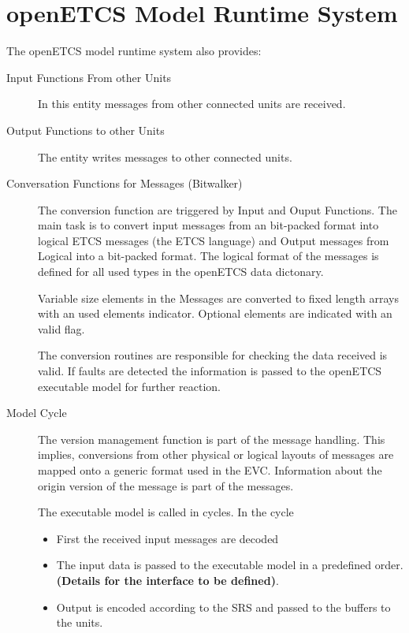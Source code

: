 \section{openETCS Model Runtime System}
The openETCS model runtime system also provides:
\begin{description}

\item[Input Functions From other Units]
In this entity messages from other connected units are received.

\item[Output Functions to other Units]
The entity writes messages to other connected units.

\item[Conversation Functions for Messages (Bitwalker)]
The conversion function are triggered by Input and Ouput Functions. The main task is to convert input messages from an bit-packed format into logical ETCS messages (the ETCS language) and Output messages from Logical into a bit-packed format. The logical format of the messages is defined for all used types in the openETCS data dictonary.

Variable size elements in the Messages are converted to fixed length arrays with an used elements indicator. Optional elements are indicated with an valid flag.

The conversion routines are responsible for checking the data received is valid. If  faults are detected the information is passed to the openETCS executable model for further reaction. 

\item[Model Cycle]
The version management function is part of the message handling. This implies, conversions from other physical or logical layouts of messages are mapped onto a generic format used in the EVC. Information about the origin version of the message is part of the messages.
 
The executable model is called in cycles. In the cycle 
\begin{itemize}
\item First the received input messages are decoded
\item The input data is passed to the executable model in a predefined order. \textbf{(Details for the interface to be defined)}.
\item Output is encoded according to the {SRS} and passed to the  buffers to the units.
\end{itemize}
\end{description}


